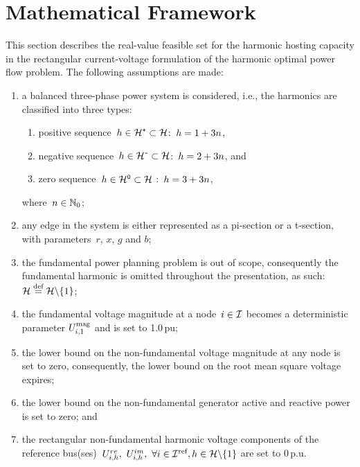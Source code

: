 \documentclass[journal]{IEEEtran}
\newcommand*{\defeq}{\stackrel{\text{def}}{=}}
\begin{document}
\section{Mathematical Framework}
\label{sec:mathematical_framework}

This section describes the real-value feasible set for the harmonic hosting capacity in the rectangular current-voltage formulation of the harmonic optimal power flow problem. The following assumptions are made:
\begin{enumerate}
    \item a balanced three-phase power system is considered, i.e., the harmonics are classified into three types:
    \begin{enumerate}
        \item positive sequence~$h \in \mathcal{H}^{\texttt{+}} \subset \mathcal{H}$:~$h=1+3n$,
        \item negative sequence~$h \in \mathcal{H}^{\texttt{-}} \subset \mathcal{H}$:~$h=2+3n$, and
        \item zero sequence~$h \in \mathcal{H}^{\texttt{0}} \subset \mathcal{H}$ :~$h=3+3n$,
    \end{enumerate}
    where~$n \in \mathbb{N}_{0}$;
    \item any edge in the system is either represented as a pi-section or a t-section, with parameters~$r$, $x$, $g$ and $b$;
    \item the fundamental power planning problem is out of scope, consequently the fundamental harmonic is omitted throughout the presentation, as such: $\HarmonicSet \defeq \HarmonicSet \backslash \{1\}$;
    \item the fundamental voltage magnitude at a node~$i \in \mathcal{I}$ becomes a deterministic parameter $U_{i,1}^{\text{mag}}$ and is set to 1.0\,pu;
    \item the lower bound on the non-fundamental voltage magnitude at any node is set to zero, consequently, the lower bound on the root mean square voltage expires; 
    \item the lower bound on the non-fundamental generator active and reactive power is set to zero; and
    \item the rectangular non-fundamental harmonic voltage components of the reference bus(ses)~$U^{re}_{i,h},~U^{im}_{i,h},~\forall i \in \mathcal{I}^{\text{ref}}, h \in \mathcal{H} \backslash \{1\}$ are set to 0\,p.u.
\end{enumerate}
\end{document}
